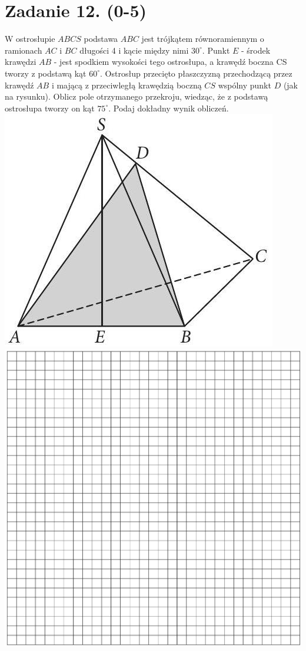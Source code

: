 \documentclass[10pt]{article}
\begin{document}
\section*{Zadanie 12. (0-5)}
W ostrosłupie \(A B C S\) podstawa \(A B C\) jest trójkątem równoramiennym o ramionach \(A C\) i \(B C\) długości 4 i kącie między nimi \(30^{\circ}\). Punkt \(E\) - środek krawędzi \(A B\) - jest spodkiem wysokości tego ostrosłupa, a krawędź boczna CS tworzy z podstawą kąt \(60^{\circ}\). Ostrosłup przecięto płaszczyzną przechodzącą przez krawędź \(A B\) i mającą z przeciwległą krawędzią boczną \(C S\) wspólny punkt \(D\) (jak na rysunku). Oblicz pole otrzymanego przekroju, wiedząc, że z podstawą ostrosłupa tworzy on kąt \(75^{\circ}\). Podaj dokładny wynik obliczeń.\\
\includegraphics[max width=\textwidth, center]{2024_11_21_a7a52c0c0974ad42b88bg-10}\\
\includegraphics[max width=\textwidth, center]{2024_11_21_a7a52c0c0974ad42b88bg-10(1)}\\
\end{document}
